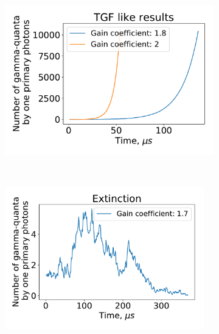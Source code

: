 \documentclass[utf8]{webofc}
\begin{document}
\begin{figure}[ht!]
	\begin{subfigure}[b]{0.5\textwidth}
		\includegraphics[width=0.95\linewidth]{figures/proofTGF.pdf}
		\caption{}
		\label{pic-tgf-a}
	\end{subfigure}
	~
	\begin{subfigure}[b]{0.5\textwidth}
		\includegraphics[width=0.95\textwidth]{figures/Extinction.pdf}
		\caption{}
		\label{pic-ext-b}
	\end{subfigure}
	\caption{}
\end{figure}
\end{document}
